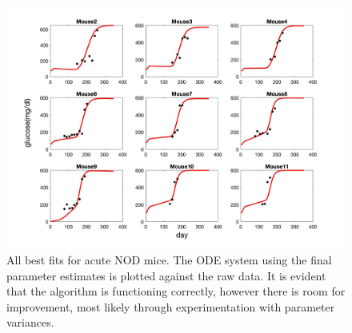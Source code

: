 \begin{figure}[H]
    \centering
    \includegraphics[width=15cm]{Kalman_Filter_Images/Dual_Acute_Mouse_Fits.jpg}
    \caption{All best fits for acute NOD mice. The ODE system using the final parameter estimates is plotted against the raw data. It is evident that the algorithm is functioning correctly, however there is room for improvement, most likely through experimentation with parameter variances.}
    \label{fig:T1D_Dual_AllAcute_Plots}
\end{figure}

